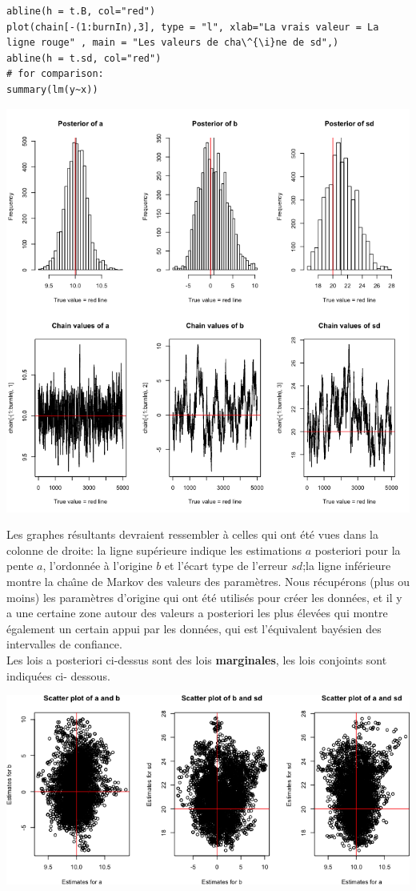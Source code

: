 \begin{Exemple}
\begin{lstlisting}
abline(h = t.B, col="red")
plot(chain[-(1:burnIn),3], type = "l", xlab="La vrais valeur = La ligne rouge" , main = "Les valeurs de cha\^{\i}ne de sd",)
abline(h = t.sd, col="red")
# for comparison:
summary(lm(y~x))
\end{lstlisting}
\begin{center}
		\includegraphics[width=1.0\linewidth]{Images/example9c.png}
\end{center}
Les graphes r\'esultants devraient ressembler \`a celles qui ont \'et\'e vues dans la colonne de droite: la ligne sup\'erieure indique les estimations $a$ posteriori pour la pente $a$, l'ordonn\'ee \`a l’origine $b$ et l'\'ecart type de l'erreur $sd$;la ligne inf\'erieure montre la cha\^{\i}ne de Markov des valeurs des param\`etres.  Nous r\'ecup\'erons (plus ou moins) les param\`etres d'origine qui ont \'et\'e utilis\'es pour cr\'eer les donn\'ees, et il y a une certaine zone autour des valeurs a posteriori les plus \'elev\'ees qui montre \'egalement un certain appui par les donn\'ees, qui est l'\'equivalent bay\'esien des intervalles de confiance.\\
Les lois a posteriori ci-dessus sont des lois \textbf{marginales}, les lois conjoints sont indiqu\'ees ci- dessous. 
\begin{center}
		\includegraphics[width=0.99\linewidth]{Images/example9d.png}

\end{center}
\end{Exemple}
